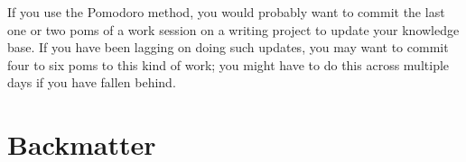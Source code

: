 \documentclass[10pt,letterpaper]{article}
\begin{document}
If you use the Pomodoro method, you would probably want to commit the last one or two poms of a work session on a writing project to update your knowledge base.
If you have been lagging on doing such updates, you may want to commit four to six poms to this kind of work; you might have to do this across multiple days if you have fallen behind.


\section{Backmatter}

%

\printindex
\end{document}
